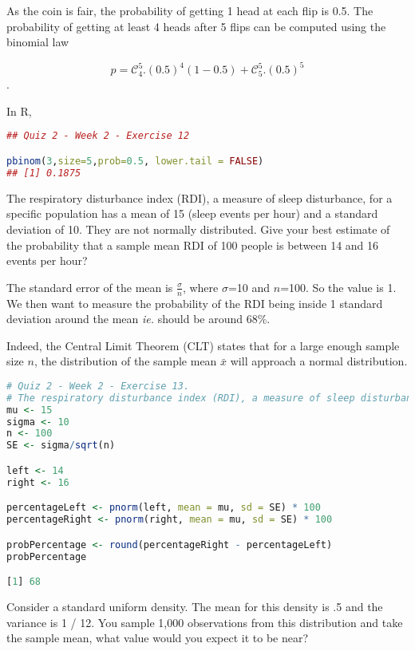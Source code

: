 \documentclass{homework}
\begin{document}
As the coin is fair, the probability of getting 1 head at each flip is 0.5. The probability of getting at least 4 heads after 5 flips can be computed using the binomial law 

$$
p=\mathcal{C}_{4}^{5}.(0.5)^4(1-0.5)+\mathcal{C}_{5}^{5}.(0.5)^5
$$.

In R, 

\begin{lstlisting}[language=R]
## Quiz 2 - Week 2 - Exercise 12

pbinom(3,size=5,prob=0.5, lower.tail = FALSE)
## [1] 0.1875
\end{lstlisting}

\begin{tcolorbox}[title=Question 13]
The respiratory disturbance index (RDI), a measure of sleep disturbance, for a specific population has a mean of 15 (sleep events per hour) and a standard deviation of 10. They are not normally distributed. Give your best estimate of the probability that a sample mean RDI of 100 people is between 14 and 16 events per hour?
\end{tcolorbox}

The standard error of the mean is $\frac{\sigma}{n}$, where $\sigma$=10 and $n$=100. So the value is 1. We then want to measure the probability of the RDI being inside 1 standard deviation around the mean \textit{ie.} should be around 68\%.

Indeed, the Central Limit Theorem (CLT) states that for a large enough sample size $n$, the distribution of the sample mean $\bar x$ will approach a normal distribution.
\begin{lstlisting}[language=R]
# Quiz 2 - Week 2 - Exercise 13.
# The respiratory disturbance index (RDI), a measure of sleep disturbance, for a specific population has a mean of 15 (sleep events per hour) and a standard deviation of 10. They are not normally distributed. Give your best estimate of the probability that a sample mean RDI of 100 people is between 14 and 16 events per hour?
mu <- 15
sigma <- 10
n <- 100
SE <- sigma/sqrt(n)

left <- 14
right <- 16

percentageLeft <- pnorm(left, mean = mu, sd = SE) * 100
percentageRight <- pnorm(right, mean = mu, sd = SE) * 100

probPercentage <- round(percentageRight - percentageLeft)
probPercentage

[1] 68
\end{lstlisting}

\begin{tcolorbox}[title=Question 14]
Consider a standard uniform density. The mean for this density is .5 and the variance is 1 / 12. You sample 1,000 observations from this distribution and take the sample mean, what value would you expect it to be near?
\end{tcolorbox}
\end{document}

